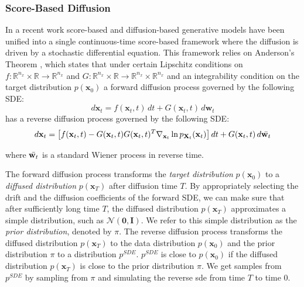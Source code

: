 \subsubsection{Score-Based Diffusion}


In a recent work \cite{song2021sde} score-based  \cite{hyvarinen2005score_original, song2020generative_score} and diffusion-based \cite{sohldickstein2015diffusion_original, ho2020denoising} generative models have been unified into a single continuous-time score-based framework where the diffusion is driven by a stochastic differential equation.  This framework relies on Anderson's Theorem \cite{anderson1982reverse_time_sde}, which states that under certain Lipschitz conditions on $f : \mathbb{R}^{n_x} \times \mathbb{R} \xrightarrow{} \mathbb{R}^{n_x}$ and $G : \mathbb{R}^{n_x} \times \mathbb{R}\xrightarrow{} \mathbb{R}^{n_x} \times \mathbb{R}^{n_x}$ and an integrability condition on the target distribution $p(\textbf{x}_0)$ a forward diffusion process governed by the following SDE:
\begin{equation}
    \label{ch2:eq:forward_sde}
    d\mathbf{x}_t = f(\mathbf{x}_t, t) \, dt + G(\mathbf{x}_t, t) \, d\mathbf{w}_t
\end{equation}
has a reverse diffusion process governed by the following SDE:
\begin{equation}
    \label{ch2:eq:reverse_sde}
    d\mathbf{x}_t = \left[f(\mathbf{x}_t, t) - G(\mathbf{x}_t, t) G(\mathbf{x}_t, t)^T \nabla_{\mathbf{x}_t} \ln p_{\mathbf{X}_t}(\mathbf{x}_t) \right] dt + G(\mathbf{x}_t, t) \, d\Bar{\mathbf{w}_t}
\end{equation}

\noindent where $\Bar{\textbf{w}_t}$ is a standard Wiener process in reverse time. 

The forward diffusion process transforms the \textit{target distribution} $p(\textbf{x}_0)$ to a \textit{diffused distribution} $p(\textbf{x}_T)$ after diffusion time $T$. By appropriately selecting the drift and the diffusion coefficients of the forward SDE, we can make sure that after sufficiently long time $T$, the diffused distribution $p(\textbf{x}_T)$ approximates a simple distribution, such as $\mathcal{N}(\textbf{0},\textbf{I})$. We refer to this simple distribution as the \textit{prior distribution}, denoted by $\pi$. The reverse diffusion process transforms the diffused distribution $p(\textbf{x}_T)$ to the data distribution $p(\textbf{x}_0)$ and the prior distribution $\pi$ to a distribution $p^{SDE}$. $p^{SDE}$ is close to $p(\textbf{x}_0)$ if the diffused distribution $p(\textbf{x}_T)$ is close to the prior distribution $\pi$. We get samples from $p^{SDE}$ by sampling from $\pi$ and simulating the reverse sde from time $T$ to time $0$.

